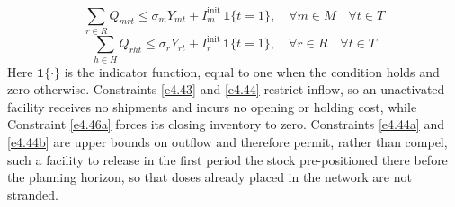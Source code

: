 \documentclass[a4paper]{elsarticle}
\begin{document}
{\begin{equation}
\label{e4.44a}
\tag{7a}
\sum_{r \in R} Q_{mrt} \leq \sigma_m Y_{mt} + I^{\text{init}}_{m}\, \mathbf{1}\{t = 1\},
\quad \forall m \in M \quad \forall t \in T
\end{equation}
\begin{equation}
\label{e4.44b}
\tag{7b}
\sum_{h \in H} Q_{rht} \leq \sigma_r Y_{rt} + I^{\text{init}}_{r}\, \mathbf{1}\{t = 1\},
\quad \forall r \in R \quad \forall t \in T
\end{equation}
Here $\mathbf{1}\{\cdot\}$ is the indicator function, equal to one when the condition holds and zero otherwise. Constraints \ref{e4.43} and \ref{e4.44} restrict inflow, so an unactivated facility receives no shipments and incurs no opening or holding cost, while Constraint \ref{e4.46a} forces its closing inventory to zero. Constraints \ref{e4.44a} and \ref{e4.44b} are upper bounds on outflow and therefore permit, rather than compel, such a facility to release in the first period the stock pre-positioned there before the planning horizon, so that doses already placed in the network are not stranded.
}
\end{document}
